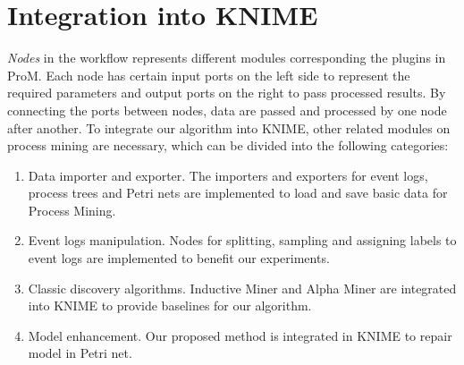 \section{Integration into KNIME}
\emph{Nodes} in the workflow represents different modules corresponding the plugins in ProM. Each node has certain input ports on the left side to represent the required parameters and  output ports on the right to pass processed results. By connecting the ports between nodes, data are passed and processed by one node after another. To integrate our algorithm into KNIME, other related modules on process mining are necessary, which can be divided into the following categories: 
\begin{enumerate}
	\item Data importer and exporter. The importers and exporters for event logs, process trees and Petri nets are implemented to load and save basic data for Process Mining.
	\item Event logs manipulation. Nodes for splitting, sampling and assigning labels to event logs are implemented to benefit our experiments.
	\item Classic discovery algorithms. Inductive Miner and Alpha Miner are integrated into KNIME to provide baselines for our algorithm.
	\item Model enhancement. Our proposed method is integrated in KNIME to repair model in Petri net.
\end{enumerate}

